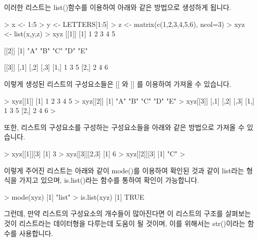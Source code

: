 이러한 리스트는 list()함수를 이용하여 아래와 같은 방법으로 생성하게 됩니다.

\begin{Schunk}
\begin{Soutput}
> x <- 1:5
> y <- LETTERS[1:5]
> z <- matrix(c(1,2,3,4,5,6), ncol=3)
> xyz <- list(x,y,z)
> xyz
[[1]]
[1] 1 2 3 4 5

[[2]]
[1] "A" "B" "C" "D" "E"

[[3]]
     [,1] [,2] [,3]
[1,]    1    3    5
[2,]    2    4    6
 
\end{Soutput}
\end{Schunk}

이렇게 생성된 리스트의 구성요소들은 $[[$ 와 $]]$ 를 이용하여 가져올 수 있습니다.

\begin{Schunk}
\begin{Soutput}
> xyz[[1]]
[1] 1 2 3 4 5
> xyz[[2]]
[1] "A" "B" "C" "D" "E"
> xyz[[3]]
     [,1] [,2] [,3]
[1,]    1    3    5
[2,]    2    4    6
> 
\end{Soutput}
\end{Schunk}

또한, 리스트의 구성요소를 구성하는 구성요소들을 아래와 같은 방법으로 가져올 수 있습니다.
\begin{Schunk}
\begin{Soutput}
> xyz[[1]][3]
[1] 3
> xyz[[3]][2,3]
[1] 6
> xyz[[2]][3]
[1] "C"
> 
\end{Soutput}
\end{Schunk}

이렇게 주어진 리스트는 아래와 같이 mode()를 이용하여 확인된 것과 같이 list라는 형식을 가지고 있으며, is.list()라는 함수를 통하여 확인이 가능합니다.

\begin{Schunk}
\begin{Soutput}
> mode(xyz)
[1] "list"
> is.list(xyz)
[1] TRUE
\end{Soutput}
\end{Schunk}

그런데, 만약 리스트의 구성요소의 개수들이 많아진다면 이 리스트의 구조를 살펴보는 것이 리스트라는 데이터형을 다루는데 도움이 될 것이며, 이를 위해서는 str()이라는 함수를 사용합니다.

\begin{Schunk}
\end{Schunk}

